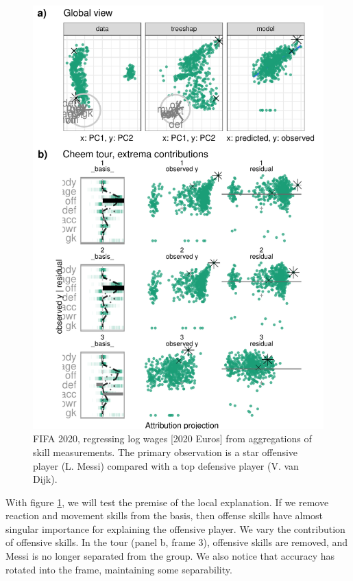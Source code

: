 \documentclass[
  article]{article}
\begin{document}
\begin{figure}

{\centering \includegraphics[width=1\linewidth]{./figures/case_fifa} 

}

\caption{FIFA 2020, regressing log wages [2020 Euros] from aggregations of skill measurements. The primary observation is a star offensive player (L. Messi) compared with a top defensive player (V. van Dijk).}\label{fig:casefifa}
\end{figure}

With figure \ref{fig:casefifa}, we will test the premise of the local explanation. If we remove reaction and movement skills from the basis, then offense skills have almost singular importance for explaining the offensive player. We vary the contribution of offensive skills. In the tour (panel b, frame 3), offensive skills are removed, and Messi is no longer separated from the group. We also notice that accuracy has rotated into the frame, maintaining some separability.
\end{document}
